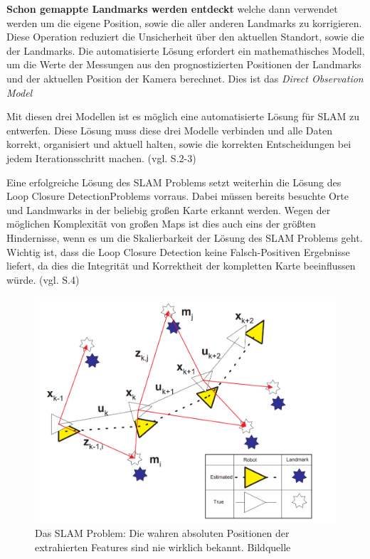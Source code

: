\textbf{Schon gemappte Landmarks werden entdeckt} welche dann verwendet werden um die eigene Position, sowie die aller anderen Landmarks zu korrigieren. Diese Operation reduziert die Unsicherheit über den aktuellen Standort, sowie die der Landmarks. Die automatisierte Lösung erfordert ein mathemathisches Modell, um die Werte der Messungen aus den prognostizierten Positionen der Landmarks und der aktuellen Position der Kamera berechnet. Dies ist das \glqq \textit{Direct Observation Model} \grqq

Mit diesen drei Modellen ist es möglich eine automatisierte Lösung für SLAM zu entwerfen. Diese Lösung muss diese drei Modelle verbinden und alle Daten korrekt, organisiert und aktuell halten, sowie die korrekten Entscheidungen bei jedem Iterationsschritt machen. (vgl. \cite{ekf_slam} S.2-3)

Eine erfolgreiche Lösung des SLAM Problems setzt weiterhin die Lösung des \glqq Loop Closure Detection\grqq Problems vorraus. Dabei müssen bereits besuchte Orte und Landmwarks in der beliebig großen Karte erkannt werden. Wegen der möglichen Komplexität von großen Maps ist dies auch eins der größten Hindernisse, wenn es um die Skalierbarkeit der Lösung des SLAM Problems geht. Wichtig ist, dass die Loop Closure Detection keine Falsch-Positiven Ergebnisse liefert, da dies die Integrität und Korrektheit der kompletten Karte beeinflussen würde. (vgl. \cite{ar_slam} S.4)

\begin{figure}[H]
	\centering
	\includegraphics[scale=0.35]{slam_problem.png}
	\caption{Das SLAM Problem: Die wahren absoluten Positionen der extrahierten Features sind nie wirklich bekannt. Bildquelle \cite{slam}}
\end{figure} 

